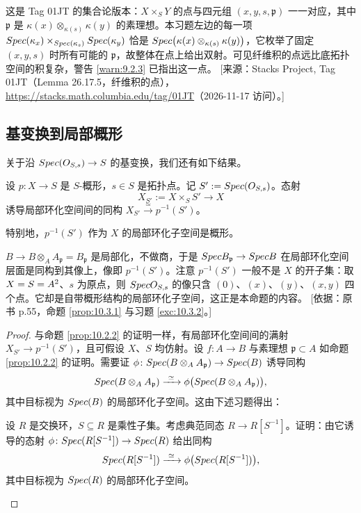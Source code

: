 \begin{yizhu}
这是 Tag 01JT 的集合论版本：$X \times_S Y$ 的点与四元组 $(x,y,s,\mathfrak p)$ 一一对应，其中 $\mathfrak p$ 是 $\kappa(x) \otimes_{\kappa(s)} \kappa(y)$ 的素理想。本习题左边的每一项 $Spec(\kappa_x) \times_{Spec(\kappa_s)} Spec(\kappa_y)$ 恰是 $Spec\bigl(\kappa(x) \otimes_{\kappa(s)} \kappa(y)\bigr)$，它枚举了固定 $(x,y,s)$ 时所有可能的 $\mathfrak p$，故整体在点上给出双射。可见纤维积的点远比底拓扑空间的积复杂，警告 \ref{warn:9.2.3} 已指出这一点。
[来源：Stacks Project, Tag 01JT（Lemma 26.17.5，纤维积的点），\url{https://stacks.math.columbia.edu/tag/01JT}（2026-11-17 访问）。]
\end{yizhu}

\subsection{基变换到局部概形}\label{sec:10.3}

关于沿 $Spec(O_{S,s}) \to S$ 的基变换，我们还有如下结果。

\begin{proposition}\label{prop:10.3.1}
设 $p \colon X \to S$ 是 $S$-概形，$s \in S$ 是拓扑点。记 $S' := Spec(O_{S,s})$。态射
\[
X_{S'} := X \times_S S' \longrightarrow X
\]
诱导局部环化空间间的同构 $X_{S'} \xrightarrow{\simeq} p^{-1}(S')$。

特别地，$p^{-1}(S')$ 作为 $X$ 的局部环化子空间是概形。
\end{proposition}

\begin{yizhu}
$B \to B \otimes_A A_{\mathfrak p} = B_{\mathfrak p}$ 是局部化，不做商，于是 $Spec B_{\mathfrak p} \to Spec B$ 在局部环化空间层面是同构到其像上，像即 $p^{-1}(S')$。注意 $p^{-1}(S')$ 一般不是 $X$ 的开子集：取 $X = S = A^2$、$s$ 为原点，则 $Spec O_{S,s}$ 的像只含 $(0)$、$(x)$、$(y)$、$(x,y)$ 四个点。它却是自带概形结构的局部环化子空间，这正是本命题的内容。
[依据：原书 p.55，命题 \ref{prop:10.3.1} 与习题 \ref{exc:10.3.2}。]
\end{yizhu}

\begin{proof}
与命题 \ref{prop:10.2.2} 的证明一样，有局部环化空间间的满射 $X_{S'} \to p^{-1}(S')$，且可假设 $X$、$S$ 均仿射。设 $f \colon A \to B$ 与素理想 $\mathfrak p \subset A$ 如命题 \ref{prop:10.2.2} 的证明。需要证 $\phi \colon Spec(B \otimes_A A_{\mathfrak p}) \to Spec(B)$ 诱导同构
\[
Spec(B \otimes_A A_{\mathfrak p}) \xrightarrow{\ \simeq\ } \phi\bigl(Spec(B \otimes_A A_{\mathfrak p})\bigr),
\]
其中目标视为 $Spec(B)$ 的局部环化子空间。这由下述习题得出：
\begin{exercise}\label{exc:10.3.2}
设 $R$ 是交换环，$S \subseteq R$ 是乘性子集。考虑典范同态 $R \to R[S^{-1}]$。证明：由它诱导的态射 $\phi \colon Spec(R[S^{-1}]) \to Spec(R)$ 给出同构
\[
Spec(R[S^{-1}]) \xrightarrow{\ \simeq\ } \phi\bigl(Spec(R[S^{-1}])\bigr),
\]
其中目标视为 $Spec(R)$ 的局部环化子空间。
\end{exercise}
\end{proof}
